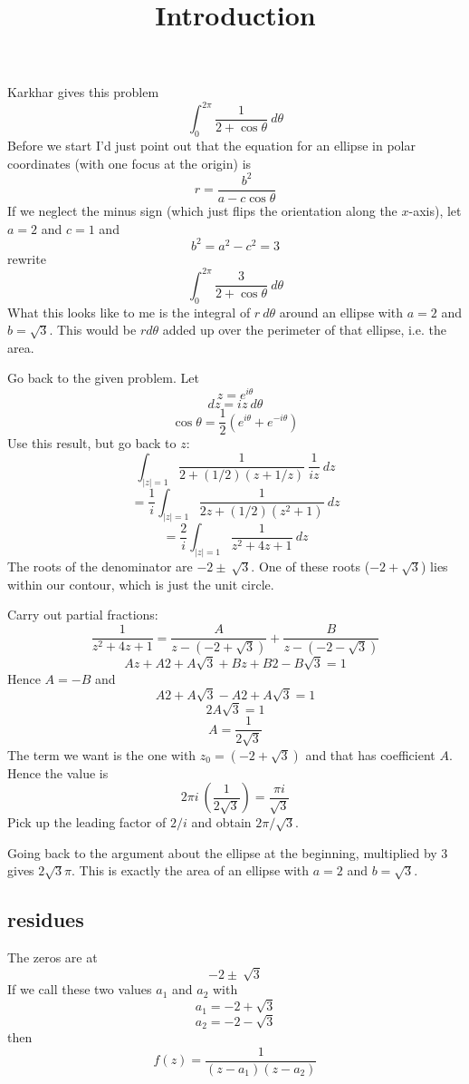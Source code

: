 \documentclass[11pt, oneside]{article}
\title{Introduction}
\date{}
\begin{document}
\maketitle
\Large



Karkhar gives this problem
\[ \int_0^{2\pi} \frac{1}{2 + \cos \theta} \ d \theta \]
Before we start I'd just point out that the equation for an ellipse in polar coordinates (with one focus at the origin) is
\[ r = \frac{b^2}{a - c \cos \theta} \]
If we neglect the minus sign (which just flips the orientation along the $x$-axis), let $a=2$ and $c=1$ and
\[ b^2 = a^2 - c^2 = 3 \]
rewrite
\[ \int_0^{2\pi} \frac{3}{2 + \cos \theta} \ d \theta \]
What this looks like to me is the integral of $r \ d \theta$ around an ellipse with $a = 2$ and $b = \sqrt{3}$.  This would be $r d \theta$ added up over the perimeter of that ellipse, i.e. the area.

Go back to the given problem.  Let
\[ z = e^{i\theta} \]
\[ dz = i z \ d \theta \]
\[ \cos \theta = \frac{1}{2}(e^{i\theta} + e^{-i \theta} ) \]
Use this result, but go back to $z$:
\[ \int_{|z|=1} \frac{1}{2 + (1/2)(z + 1/z)} \ \frac{1}{iz} \ dz \]
\[ = \frac{1}{i}  \int_{|z|=1} \frac{1}{2z + (1/2)(z^2 + 1)} \ dz \]
\[ = \frac{2}{i}  \int_{|z|=1} \frac{1}{z^2 + 4z + 1} \ dz \]
The roots of the denominator are $-2 \pm \ \sqrt{3}$.  One of these roots ($-2 + \sqrt{3}$) lies within our contour, which is just the unit circle.

Carry out partial fractions:
\[ \frac{1}{z^2 + 4z + 1} = \frac{A}{z - (-2 + \sqrt{3})} + \frac{B}{z - (-2 - \sqrt{3})} \]
\[ Az + A2 + A \sqrt{3} + Bz + B2 - B \sqrt{3} = 1 \]
Hence $A = -B$ and
\[ A2 + A \sqrt{3} -A2 + A \sqrt{3} = 1 \]
\[ 2A \sqrt{3} = 1 \]
\[ A = \frac{1}{2 \sqrt{3}} \]
The term we want is the one with $z_0 = (-2 + \sqrt{3})$ and that has coefficient $A$.  Hence the value is
\[ 2 \pi i \ (\frac{1}{2 \sqrt{3}}) = \frac{\pi i}{\sqrt{3}} \]
Pick up the leading factor of $2/i$ and obtain $2 \pi / \sqrt{3}$.

Going back to the argument about the ellipse at the beginning, multiplied by $3$ gives $2 \sqrt{3} \pi$.  This is exactly the area of an ellipse with $a = 2$ and $b = \sqrt{3}$.

\subsection*{residues}
The zeros are at 
\[ -2 \pm \ \sqrt{3} \]
If we call these two values $a_1$ and $a_2$ with
\[ a_1 = -2 + \sqrt{3} \]
\[ a_2 = -2 - \sqrt{3} \]
then
\[ f(z) = \frac{1}{(z - a_1)(z - a_2)} \]
\end{document}
